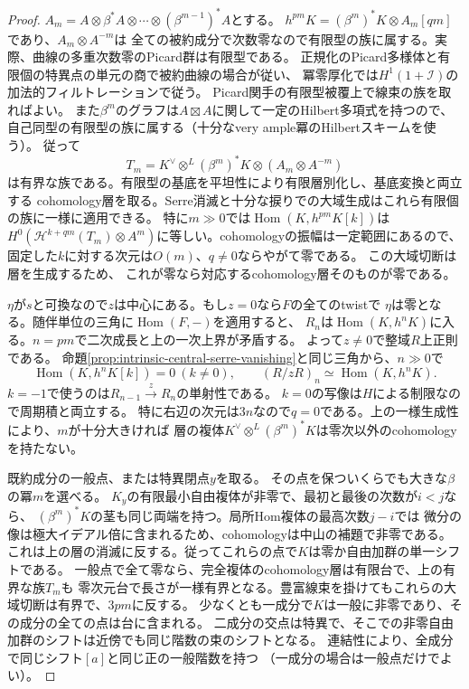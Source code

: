 \documentclass[11pt,a4paper]{ltjsarticle}
\theoremstyle{definition}
\begin{document}
\begin{proof}
$A_m=A\otimes\beta^*A\otimes\cdots\otimes(\beta^{m-1})^*A$とする。
$h^{pm}K=(\beta^m)^*K\otimes A_m[qm]$であり、$A_m\otimes A^{-m}$は
全ての被約成分で次数零なので有限型の族に属する。実際、曲線の多重次数零のPicard群は有限型である。
正規化のPicard多様体と有限個の特異点の単元の商で被約曲線の場合が従い、
冪零厚化では$H^1(1+\mathcal I)$の加法的フィルトレーションで従う。
Picard関手の有限型被覆上で線束の族を取ればよい。
また$\beta^m$のグラフは$A\boxtimes A$に関して一定のHilbert多項式を持つので、
自己同型の有限型の族に属する（十分なvery ample冪のHilbertスキームを使う）。
従って
\[
 T_m=K^\vee\otimes^L(\beta^m)^*K\otimes (A_m\otimes A^{-m})
\]
は有界な族である。有限型の基底を平坦性により有限層別化し、基底変換と両立する
cohomology層を取る。Serre消滅と十分な捩りでの大域生成はこれら有限個の族に一様に適用できる。
特に$m\gg0$では$\operatorname{Hom}(K,h^{pm}K[k])$は
$H^0(\mathcal H^{k+qm}(T_m)\otimes A^m)$に等しい。cohomologyの振幅は一定範囲にあるので、
固定した$k$に対する次元は$O(m)$、$q\ne0$ならやがて零である。
この大域切断は層を生成するため、
これが零なら対応するcohomology層そのものが零である。

$\eta$が$s$と可換なので$z$は中心にある。もし$z=0$なら$F$の全てのtwistで
$\eta$は零となる。随伴単位の三角に$\operatorname{Hom}(F,-)$を適用すると、
$R_n$は$\operatorname{Hom}(K,h^nK)$に入る。$n=pm$で二次成長と上の一次上界が矛盾する。
よって$z\ne0$で整域$R$上正則である。
命題\ref{prop:intrinsic-central-serre-vanishing}と同じ三角から、$n\gg0$で
\[
 \operatorname{Hom}(K,h^nK[k])=0\ (k\ne0),\qquad
 (R/zR)_n\simeq\operatorname{Hom}(K,h^nK).
\]
$k=-1$で使うのは$R_{n-1}\xrightarrow{z}R_n$の単射性である。
$k=0$の写像は$H$による制限なので周期積と両立する。
特に右辺の次元は$3n$なので$q=0$である。上の一様生成性により、$m$が十分大きければ
層の複体$K^\vee\otimes^L(\beta^m)^*K$は零次以外のcohomologyを持たない。

既約成分の一般点、または特異閉点$y$を取る。
その点を保ついくらでも大きな$\beta$の冪$m$を選べる。
$K_y$の有限最小自由複体が非零で、最初と最後の次数が$i<j$なら、
$(\beta^m)^*K$の茎も同じ両端を持つ。局所Hom複体の最高次数$j-i$では
微分の像は極大イデアル倍に含まれるため、cohomologyは中山の補題で非零である。
これは上の層の消滅に反する。従ってこれらの点で$K$は零か自由加群の単一シフトである。
一般点で全て零なら、完全複体のcohomology層は有限台で、上の有界な族$T_m$も
零次元台で長さが一様有界となる。豊富線束を掛けてもこれらの大域切断は有界で、$3pm$に反する。
少なくとも一成分で$K$は一般に非零であり、その成分の全ての点は台に含まれる。
二成分の交点は特異で、そこでの非零自由加群のシフトは近傍でも同じ階数の束のシフトとなる。
連結性により、全成分で同じシフト$[a]$と同じ正の一般階数を持つ
（一成分の場合は一般点だけでよい）。


\end{proof}
\end{document}

